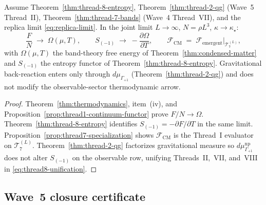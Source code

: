 \begin{theorem}
\label{thm:thread-8-thermo-limit}
Assume Theorem~\ref{thm:thread-8-entropy},
Theorem~\ref{thm:thread-2-qg} (Wave~5 Thread~II),
Theorem~\ref{thm:thread-7-bands} (Wave~4 Thread~VII), and the replica limit
\eqref{eq:replica-limit}. In the joint limit $L\to\infty$, $N=\rho L^3$,
$\kappa\to\kappa_\star$:
\begin{equation}\label{eq:thread8-unification}
  \frac{F}{N}
  \;\longrightarrow\;
  \Omega(\mu,T),
  \qquad
  S_{(-1)}
  \;\longrightarrow\;
  -\frac{\partial\Omega}{\partial T},
  \qquad
  \mathcal{F}_{\mathrm{CM}}
  \;=\;
  \mathcal{F}_{\mathrm{emergent}}\big|_{\mathcal{T}_7^{(L)}},
\end{equation}
with $\Omega(\mu,T)$ the band-theory free energy of
Theorem~\ref{thm:condensed-matter} and $S_{(-1)}$ the entropy functor of
Theorem~\ref{thm:thread-8-entropy}. Gravitational back-reaction enters only
through $d\mu_{\Gamma_{+1}}$ (Theorem~\ref{thm:thread-2-qg}) and does not
modify the observable-sector thermodynamic arrow.
\end{theorem}

\begin{proof}
Theorem~\ref{thm:thermodynamics}, item~(iv), and
Proposition~\ref{prop:thread1-continuum-functor} prove $F/N\to\Omega$.
Theorem~\ref{thm:thread-8-entropy} identifies $S_{(-1)}=-\partial F/\partial T$
in the same limit. Proposition~\ref{prop:thread7-specialization} shows
$\mathcal{F}_{\mathrm{CM}}$ is the Thread~I evaluator on $\mathcal{T}_7^{(L)}$.
Theorem~\ref{thm:thread-2-qg} factorizes gravitational measure so
$d\mu_{\Gamma_{+1}}^{\mathrm{np}}$ does not alter $S_{(-1)}$ on the
observable row, unifying Threads~II,~VII, and~VIII in
\eqref{eq:thread8-unification}.
\end{proof}

\subsection{Wave~5 closure certificate}
\label{sec:wave5-thread8:closure}

